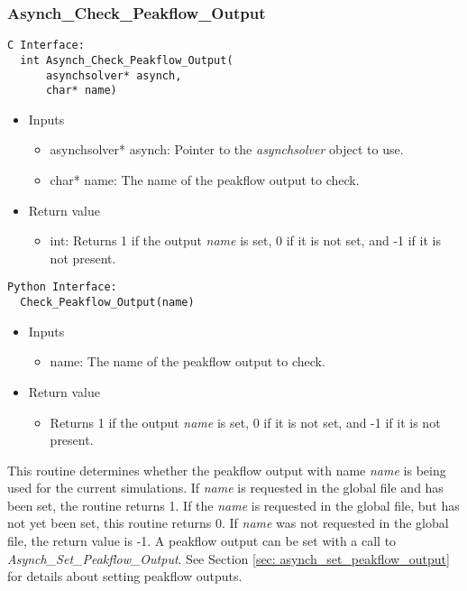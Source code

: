 \documentclass[12pt]{article}
\begin{document}
\subsubsection{Asynch\_Check\_Peakflow\_Output} \label{sec: asynch_check_peakflow_output}

\begin{lstlisting}[style=CStyle]
  C Interface:
  int Asynch_Check_Peakflow_Output(
      asynchsolver* asynch,
      char* name)
\end{lstlisting}
\begin{itemize}
 \item Inputs
  \begin{itemize}
   \item asynchsolver* asynch: Pointer to the \emph{asynchsolver} object to use.
   \item char* name: The name of the peakflow output to check.
  \end{itemize}
 \item Return value
  \begin{itemize}
   \item int: Returns 1 if the output \emph{name} is set, 0 if it is not set, and -1 if it is not present.
  \end{itemize}
\end{itemize}
\begin{lstlisting}[style=PythonStyle]
  Python Interface:
  Check_Peakflow_Output(name)
\end{lstlisting}
\begin{itemize}
 \item Inputs
  \begin{itemize}
   \item name: The name of the peakflow output to check.
  \end{itemize}
 \item Return value
  \begin{itemize}
   \item Returns 1 if the output \emph{name} is set, 0 if it is not set, and -1 if it is not present.
  \end{itemize}
\end{itemize}
This routine determines whether the peakflow output with name \emph{name} is being used for the current simulations. If \emph{name} is requested in the global file and has been set, the routine returns 1. If the \emph{name} is requested in the global file, but has not yet been set, this routine returns 0. If \emph{name} was not requested in the global file, the return value is -1. A peakflow output can be set with a call to \emph{Asynch\_Set\_Peakflow\_Output}. See Section \ref{sec: asynch_set_peakflow_output} for details about setting peakflow outputs.
\end{document}
